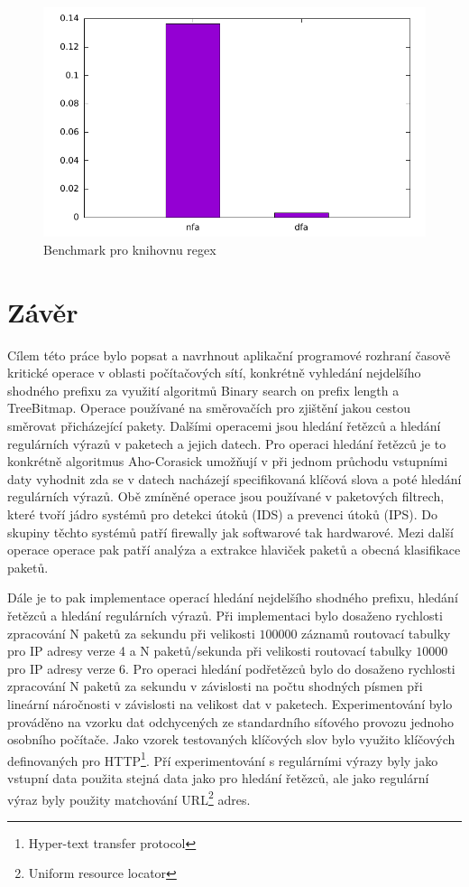 \begin{figure}[!htb]
	\centering
	\includegraphics[scale=0.7]{fig/regex.pdf}
	\caption{Benchmark pro knihovnu regex}
\end{figure}\label{fig:regex}

\chapter{Závěr}\label{chapter:conclusion}
Cílem této práce bylo popsat a navrhnout aplikační programové rozhraní časově kritické operace v oblasti počítačových sítí,
konkrétně vyhledání nejdelšího shodného prefixu za využití algoritmů Binary search on prefix length
a TreeBitmap. Operace používané na směrovačích pro zjištění jakou cestou směrovat přicházející pakety.
Dalšími operacemi jsou hledání řetězců a hledání regulárních výrazů v paketech a jejich datech.
Pro operaci hledání řetězců je to konkrétně algoritmus Aho-Corasick \cite{aho} umožňují v
při jednom průchodu vstupními daty vyhodnit zda se v datech nacházejí specifikovaná klíčová slova
a poté hledání regulárních výrazů. Obě zmíněné operace jsou používané v paketových filtrech,
které tvoří jádro systémů pro detekci útoků (IDS) a prevenci útoků (IPS). Do skupiny těchto
systémů patří firewally jak softwarové tak hardwarové. Mezi další operace operace pak patří
analýza a extrakce hlaviček paketů a obecná klasifikace paketů.

Dále je to pak implementace operací hledání nejdelšího shodného prefixu, hledání řetězců
a hledání regulárních výrazů. Při implementaci bylo dosaženo rychlosti zpracování N paketů za sekundu
při velikosti $100000$ záznamů routovací tabulky pro IP adresy verze 4 a N paketů/sekunda při velikosti
routovací tabulky $10000$ pro IP adresy verze 6. Pro operaci hledání podřetězců bylo
do dosaženo rychlosti zpracování N paketů za sekundu v závislosti na počtu shodných písmen
při lineární náročnosti v závislosti na velikost dat v paketech. Experimentování bylo prováděno
na vzorku dat odchycených ze standardního síťového provozu jednoho osobního počítače. Jako vzorek
testovaných klíčových slov bylo využito klíčových definovaných pro HTTP\footnote{Hyper-text transfer protocol}.
Pří experimentování s regulárními výrazy byly jako vstupní data použita stejná data jako pro hledání řetězců,
ale jako regulární výraz byly použity matchování URL\footnote{Uniform resource locator} adres.


